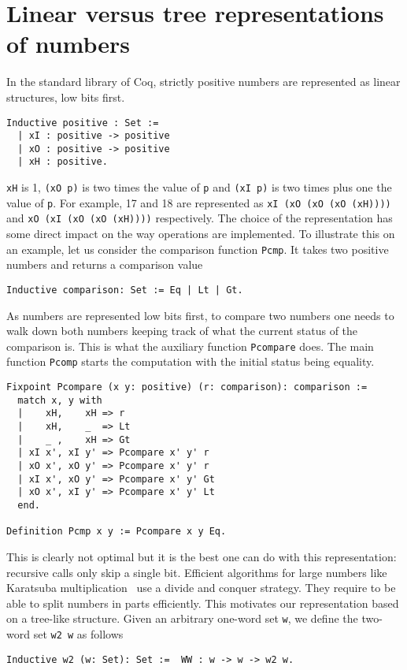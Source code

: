 \section{Linear versus tree representations of numbers\label{ZTree}}

In the standard library of {\sc Coq}, strictly positive numbers are represented as linear structures, low bits first.

\begin{verbatim}
Inductive positive : Set :=
  | xI : positive -> positive 
  | xO : positive -> positive 
  | xH : positive.
\end{verbatim}
 {\tt xH} is 1, {\tt (xO p)} is two times the value of {\tt p}
 and {\tt (xI p)} is two times plus one the value of {\tt p}.
For example, 17 and 18 are represented as {\tt xI (xO (xO (xO (xH))))} and
{\tt xO (xI (xO (xO (xH))))} respectively. The choice of the representation
has some direct impact on the way operations are implemented. To illustrate this on an example,
let us consider the comparison function {\tt Pcmp}. It takes two positive numbers
and returns a comparison value
\begin{verbatim}
Inductive comparison: Set := Eq | Lt | Gt.
\end{verbatim}
As numbers are represented low bits first, to compare two numbers 
one needs to walk down both numbers keeping track of what the current status
of the comparison is. This is what the auxiliary function {\tt Pcompare} does. The main 
function {\tt Pcomp} starts the computation with the initial status being equality.
\begin{verbatim}
Fixpoint Pcompare (x y: positive) (r: comparison): comparison :=
  match x, y with
  |    xH,    xH => r
  |    xH,    _  => Lt
  |    _ ,    xH => Gt
  | xI x', xI y' => Pcompare x' y' r
  | xO x', xO y' => Pcompare x' y' r
  | xI x', xO y' => Pcompare x' y' Gt
  | xO x', xI y' => Pcompare x' y' Lt
  end.
  
Definition Pcmp x y := Pcompare x y Eq.
\end{verbatim}
This is clearly not optimal but it is the best one can do with this 
representation: recursive calls only skip a single bit. 
Efficient algorithms for large numbers like Karatsuba multiplication~\cite{Karat} 
use a divide and conquer strategy. They require to be able to split numbers in parts efficiently. 
This motivates our representation based on a tree-like structure. 
Given an arbitrary one-word set {\tt w}, we define the two-word  set {\tt w2 w} as follows 
\begin{verbatim}
Inductive w2 (w: Set): Set :=  WW : w -> w -> w2 w.
\end{verbatim}
